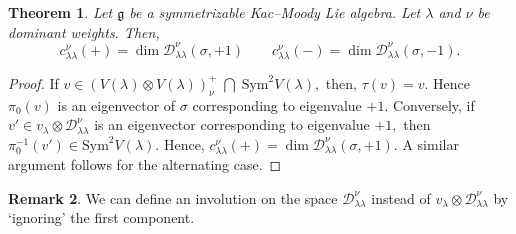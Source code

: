 \documentclass[12pt,reqno]{amsart}
\theoremstyle{plain}
\newtheorem{theorem}{Theorem}[section]
\theoremstyle{definition}
\newtheorem{rem}[theorem]{Remark}
\theoremstyle{plain}
\newcommand{\lie}{\mathfrak}
\begin{document}
\begin{theorem}\label{main}
    Let $\lie g$ be a symmetrizable Kac--Moody Lie algebra. Let $\lambda$ and $\nu$ be dominant weights. Then,
    \[
c^{\nu}_{\lambda\lambda}(+)=\dim \mathcal{D}_{\lambda\lambda}^{\nu}(\sigma,+1)
\qquad
c^{\nu}_{\lambda\lambda}(-)=\dim\mathcal{D}_{\lambda\lambda}^{\nu}(\sigma,-1).
\] 
\end{theorem}
\begin{proof}
    If $v\in (V(\lambda)\otimes V(\lambda))_\nu^+ \;\bigcap \;\text{Sym}^2V(\lambda),$ then, $\tau(v)=v.$ Hence $\pi_0(v)$ is an eigenvector of $\sigma$ corresponding to eigenvalue $+1.$ Conversely, if $v'\in v_\lambda\otimes \mathcal{D}_{\lambda\lambda}^{\nu}$ is an eigenvector corresponding to eigenvalue $+1,$ then $\pi_0^{-1}(v')\in \text{Sym}^2V(\lambda).$ Hence, $c^{\nu}_{\lambda\lambda}(+)=\dim \mathcal{D}_{\lambda\lambda}^{\nu}(\sigma,+1).$ A similar argument follows for the alternating case.
\end{proof}
\begin{rem}
    We can define an involution on the space $\mathcal{D}_{\lambda\lambda}^{\nu}$ instead of $v_\lambda\otimes \mathcal{D}_{\lambda\lambda}^{\nu}$ by `ignoring' the first component.
\end{rem}
\end{document}
